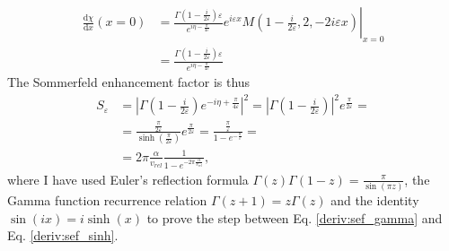 \begin{align}
	\frac{\mathrm{d}\chi }{\mathrm{d}x} (x=0) &=
	\left.
		\frac{\Gamma \left( 1- \frac{i}{2\varepsilon } \right) \varepsilon }{e^{i \eta -\frac{\pi}{4\varepsilon }}} e^{i\varepsilon x} M\left(1-\frac{i}{2\varepsilon },2,-2 i \varepsilon x\right)
	\right\vert _{x=0} \\
	&= \frac{\Gamma \left( 1- \frac{i}{2\varepsilon }\right) \varepsilon }{e^{i \eta - \frac{\pi}{4\varepsilon }}}
\end{align}
The Sommerfeld enhancement factor is thus
\begin{align}
	S_{\varepsilon } &= \left\vert \Gamma \left(1-\frac{i}{2\varepsilon }\right) e^{-i \eta + \frac{\pi}{4\varepsilon }} \right\vert ^2=\left\vert \Gamma \left(1-\frac{i}{2\varepsilon }\right)\right\vert ^2 e^{\frac{\pi}{2\varepsilon }}=\label{deriv:sef_gamma}\\
	&= \frac{\frac{\pi}{2\varepsilon }}{\sinh \left( \frac{\pi }{2 \varepsilon } \right)}e^{\frac{\pi}{2\varepsilon }} = \frac{\frac{\pi}{\varepsilon }}{1- e^{-\frac{\pi}{\varepsilon }}}=\label{deriv:sef_sinh}\\
	&= 2\pi \frac{\alpha}{v_{rel} } \frac{1}{1- e^{-2\pi \frac{\alpha}{v_{rel} }}}\label{deriv:result},
\end{align}
where I have used Euler's reflection formula \(\Gamma (z) \Gamma (1-z) = \frac{\pi}{\sin(\pi z)}\), the Gamma function recurrence relation \(\Gamma (z+1)=z \Gamma (z)\) and the identity \(\sin (ix)=i \sinh (x)\) to prove the step between Eq. \eqref{deriv:sef_gamma} and Eq. \eqref{deriv:sef_sinh}.